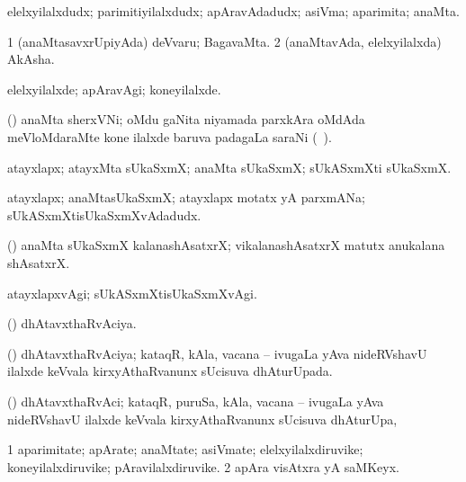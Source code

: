 \bentry
{}
\gl{\nA}
\bmng
elelxyilalxdudx; parimitiyilalxdudx; apAravAdadudx; asiVma; aparimita; anaMta. 
\emng

\noindent
\gl{\pagu}
\bmng
\bnum
\num{1}  (anaMtasavxrUpiyAda) deVvaru; BagavaMta. 
\num{2}  (anaMtavAda, elelxyilalxda) AkAsha. 
\enum
\emng
\eentry

\bentry
{}
\gl{\kirxvi}
\bmng
elelxyilalxde; apAravAgi; koneyilalxde. 
\emng
\eentry

\bentry
{}
\gl{\nA}
\bmng
(\ga) anaMta sherxVNi; oMdu gaNita niyamada parxkAra oMdAda meVloMdaraMte kone ilalxde baruva padagaLa saraNi (\udA\ ). 
\emng
\eentry

\bentry
{}
\gl{\gu}
\bmng
atayxlapx; atayxMta sUkaSxmX; anaMta sUkaSxmX; sUkASxmXti sUkaSxmX. 
\emng
\eentry

\bentry
{}
\gl{\nA}
\bmng
atayxlapx; anaMtasUkaSxmX; atayxlapx motatx yA parxmANa; sUkASxmXtisUkaSxmXvAdadudx. 
\emng
\eentry

\bentry
{}
\gl{\nA}
\bmng
(\ga) anaMta sUkaSxmX kalanashAsatxrX; vikalanashAsatxrX matutx anukalana shAsatxrX. 
\emng
\eentry

\bentry
{}
\gl{\kirxvi}
\bmng
atayxlapxvAgi; sUkASxmXtisUkaSxmXvAgi. 
\emng
\eentry

\bentry
{}
\gl{\gu}
\bmng
(\vAyx) dhAtavxthaRvAciya. 
\emng
\eentry

\bentry
{}
\gl{\gu}
\bmng
(\vAyx) dhAtavxthaRvAciya; kataqR, kAla, vacana -- ivugaLa yAva nideRVshavU ilalxde keVvala kirxyAthaRvanunx sUcisuva dhAturUpada. 
\emng
\eentry

\bentry
{}
\gl{\nA}
\bmng
(\vAyx) dhAtavxthaRvAci; kataqR, puruSa, kAla, vacana -- ivugaLa yAva nideRVshavU ilalxde keVvala kirxyAthaRvanunx sUcisuva dhAturUpa, \udA\  
\emng
\eentry

\bentry
{}
\gl{\nA}
\bmng
\bnum
\num{1} aparimitate; apArate; anaMtate; asiVmate; elelxyilalxdiruvike; koneyilalxdiruvike; pAravilalxdiruvike. 
\num{2} apAra visAtxra yA saMKeyx. 
\enum
\emng
\eentry


